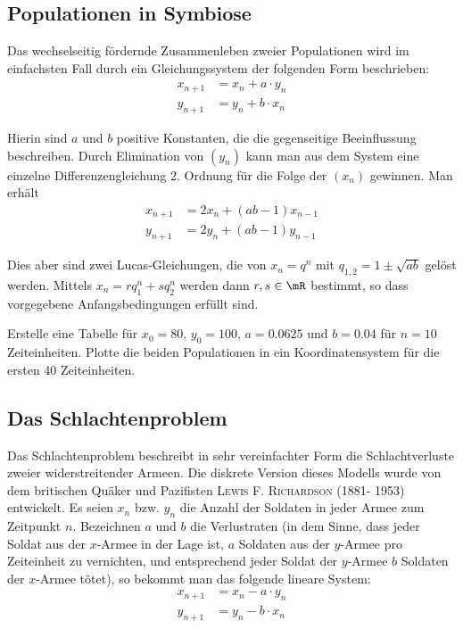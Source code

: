 \documentclass[%
11pt,%
twoside,%
titlepage,%
german,%
headsepline%
]{scrartcl}
\begin{document}
\subsection{Populationen in Symbiose}
Das wechselseitig fördernde Zusammenleben zweier Populationen wird im einfachsten Fall durch ein Gleichungssystem der folgenden Form beschrieben:
\begin{align*}
x_{n+1} &= x_n+a\cdot y_n\\
y_{n+1} &= y_n+b\cdot x_n
\end{align*}

Hierin sind $a$ und $b$ positive Konstanten, die die gegenseitige Beeinflussung beschreiben. Durch Elimination von $(y_n)$ kann man aus dem System eine einzelne Differenzengleichung 2. Ordnung für die Folge der $(x_n)$ gewinnen. Man erhält
\begin{align*}
x_{n+1} &= 2x_n+(ab-1)x_{n-1}\\
y_{n+1} &= 2y_n+(ab-1)y_{n-1}
\end{align*}

Dies aber sind zwei Lucas-Gleichungen, die von $x_n = q^n$ mit $q_{1,2} = 1\pm\sqrt{ab}$ gelöst werden. Mittels $x_n=rq_1^n+sq_2^n$ werden dann $r,s\in\mR$ bestimmt, so dass vorgegebene Anfangsbedingungen erfüllt sind.

\begin{ueb}
Erstelle eine Tabelle für $x_0=80$, $y_0=100$, $a=0.0625$ und $b=0.04$ für $n=10$ Zeiteinheiten. Plotte die beiden Populationen in ein Koordinatensystem für die ersten 40 Zeiteinheiten.
\end{ueb}

\subsection{Das Schlachtenproblem}
Das Schlachtenproblem beschreibt in sehr vereinfachter Form die Schlachtverluste zweier widerstreitender Armeen. Die diskrete Version dieses Modells wurde von dem britischen Quäker und Pazifisten \textsc{Lewis F. Richardson} (1881- 1953) entwickelt. Es seien $x_n$ bzw. $y_n$ die Anzahl der Soldaten in jeder Armee zum Zeitpunkt $n$. Bezeichnen $a$ und $b$ die Verlustraten (in dem Sinne, dass jeder Soldat aus der $x$-Armee in der Lage ist, $a$ Soldaten aus der $y$-Armee pro Zeiteinheit zu vernichten, und entsprechend jeder Soldat der $y$-Armee $b$ Soldaten der $x$-Armee tötet), so bekommt man das folgende lineare System:
\begin{align*}
x_{n+1} &= x_n-a\cdot y_n\\
y_{n+1} &= y_n-b\cdot x_n
\end{align*}
\end{document}
